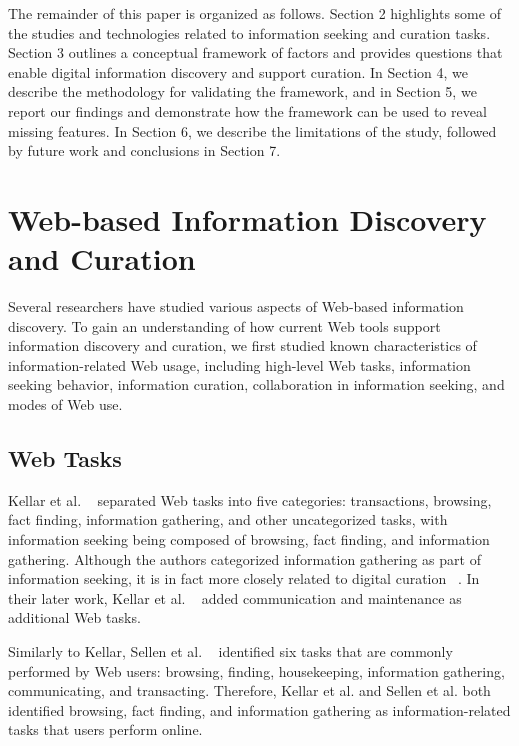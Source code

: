 \documentclass{casconpaper}
\begin{document}
{The remainder of this paper is organized as follows. Section 2 highlights some of the studies and technologies related to information seeking and curation tasks. Section 3 outlines a conceptual framework of factors and provides questions that enable digital information discovery and support curation. In Section 4, we describe the methodology for validating the framework, and in Section 5, we report our findings and demonstrate how the framework can be used to reveal missing features. In Section 6, we describe the limitations of the study, followed by future work and conclusions in Section 7.

} %


{\section{Web-based Information Discovery and Curation}

Several researchers have studied various aspects of Web-based information discovery. To gain an understanding of how current Web tools support information discovery and curation, we first studied known characteristics of information-related Web usage, including high-level Web tasks, information seeking behavior, information curation, collaboration in information seeking, and modes of Web use. 

{\subsection{Web Tasks}

Kellar et al. ~\cite{kellar2006} separated Web tasks into five categories: transactions, browsing, fact finding, information gathering, and other uncategorized tasks, with information seeking being composed of browsing, fact finding, and information gathering. Although the authors categorized information gathering as part of information seeking, it is in fact more closely related to digital curation ~\cite{beagrie, wittaker}. In their later work, Kellar et al. ~\cite{kellar2007} added communication and maintenance as additional Web tasks. 

Similarly to Kellar, Sellen et al. ~\cite{sellen} identified six tasks that are commonly performed by Web users: browsing, finding, housekeeping, information gathering, communicating, and transacting. Therefore, Kellar et al. and Sellen et al. both identified browsing, fact finding, and information gathering as information-related tasks that users perform online.   

}}
\end{document}
